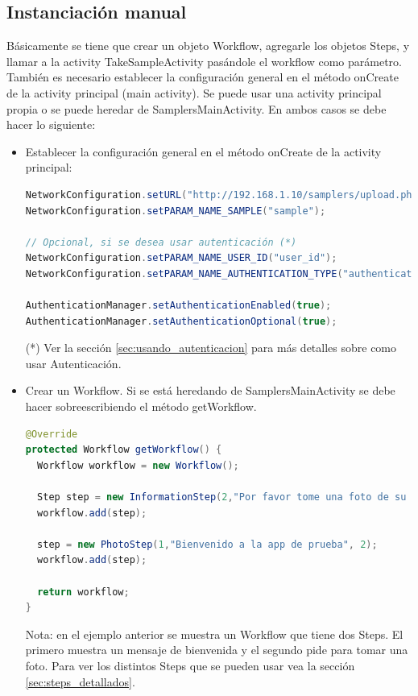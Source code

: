 \subsection{Instanciación manual}
Básicamente se tiene que crear un objeto Workflow, agregarle los objetos Steps, y llamar a la activity TakeSampleActivity pasándole el workflow como parámetro.
También es necesario establecer la configuración general en el método onCreate de la activity principal (main activity).
Se puede usar una activity principal propia o se puede heredar de SamplersMainActivity. En ambos casos se debe hacer lo siguiente:
\begin{itemize}
	\item Establecer la configuración general en el método onCreate de la activity principal:
		\begin{lstlisting}[language=Java, frame=tlb]
NetworkConfiguration.setURL("http://192.168.1.10/samplers/upload.php");
NetworkConfiguration.setPARAM_NAME_SAMPLE("sample");

// Opcional, si se desea usar autenticación (*)
NetworkConfiguration.setPARAM_NAME_USER_ID("user_id");
NetworkConfiguration.setPARAM_NAME_AUTHENTICATION_TYPE("authentication_type");

AuthenticationManager.setAuthenticationEnabled(true);
AuthenticationManager.setAuthenticationOptional(true);
		\end{lstlisting}
(*) Ver la sección \ref{sec:usando_autenticacion} para más detalles sobre como usar Autenticación.


	\item Crear un Workflow. Si se está heredando de SamplersMainActivity se debe hacer sobreescribiendo el método getWorkflow.
		\begin{lstlisting}[language=Java, frame=tlb]
@Override
protected Workflow getWorkflow() {
  Workflow workflow = new Workflow();
    	
  Step step = new InformationStep(2,"Por favor tome una foto de su gato", null);
  workflow.add(step);
    	
  step = new PhotoStep(1,"Bienvenido a la app de prueba", 2);
  workflow.add(step);
    	
  return workflow;
}		
		\end{lstlisting}
Nota: en el ejemplo anterior se muestra un Workflow que tiene dos Steps. El primero muestra un mensaje de bienvenida y el segundo pide para tomar una foto. Para ver los distintos Steps que se pueden usar vea la sección \ref{sec:steps_detallados}.


\end{itemize}
